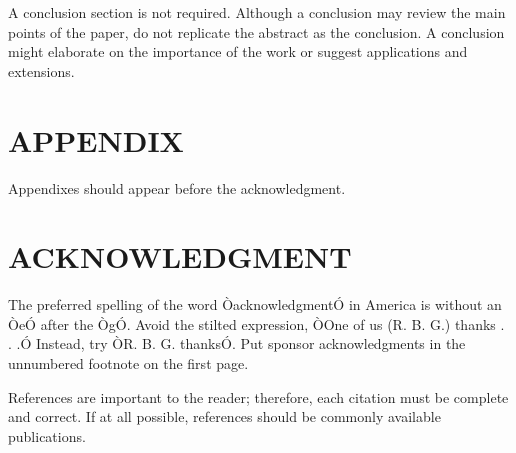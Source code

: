 \documentclass[letterpaper, 10 pt, conference]{IEEEtran}  %
\begin{document}
A conclusion section is not required. Although a conclusion may review the main points of the paper, do not replicate the abstract as the conclusion. A conclusion might elaborate on the importance of the work or suggest applications and extensions.


\addtolength{\textheight}{-12cm}   %







\section*{APPENDIX}

Appendixes should appear before the acknowledgment.

\section*{ACKNOWLEDGMENT}

The preferred spelling of the word ÒacknowledgmentÓ in America is without an ÒeÓ after the ÒgÓ. Avoid the stilted expression, ÒOne of us (R. B. G.) thanks . . .Ó  Instead, try ÒR. B. G. thanksÓ. Put sponsor acknowledgments in the unnumbered footnote on the first page.




References are important to the reader; therefore, each citation must be complete and correct. If at all possible, references should be commonly available publications.
\end{document}
